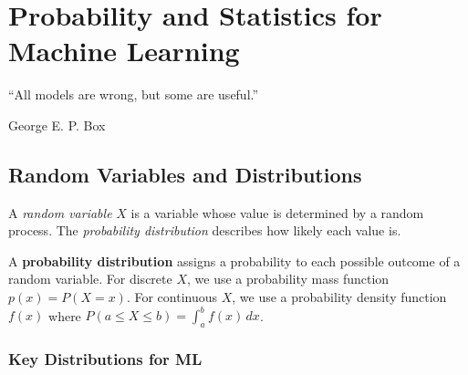 \chapter{Probability and Statistics for Machine Learning}
\label{ch:probability}

\epigraph{``All models are wrong, but some are useful.''}{George E. P. Box~\cite{box1976science}}


\section{Random Variables and Distributions}

A \emph{random variable} $X$ is a variable whose value is determined by a random process. The \emph{probability distribution} describes how likely each value is.

\begin{definition}
	A \textbf{probability distribution} assigns a probability to each possible outcome of a random variable. For discrete $X$, we use a probability mass function $p(x) = P(X = x)$. For continuous $X$, we use a probability density function $f(x)$ where $P(a \leq X \leq b) = \int_a^b f(x)\,dx$.
\end{definition}

\subsection{Key Distributions for ML}

